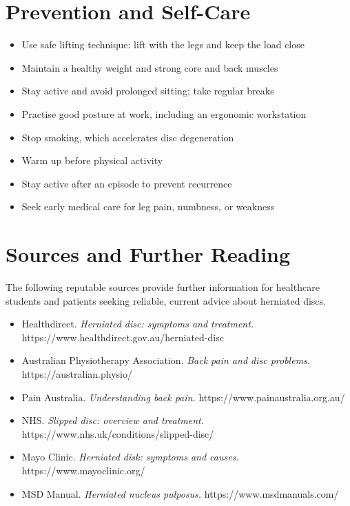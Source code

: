 \section*{Prevention and Self-Care}
\begin{itemize}
    \item Use safe lifting technique: lift with the legs and keep the load close
    \item Maintain a healthy weight and strong core and back muscles
    \item Stay active and avoid prolonged sitting; take regular breaks
    \item Practise good posture at work, including an ergonomic workstation
    \item Stop smoking, which accelerates disc degeneration
    \item Warm up before physical activity
    \item Stay active after an episode to prevent recurrence
    \item Seek early medical care for leg pain, numbness, or weakness
\end{itemize}

\section*{Sources and Further Reading}
The following reputable sources provide further information for healthcare students and patients seeking reliable, current advice about herniated discs.

\begin{itemize}
    \item Healthdirect. \textit{Herniated disc: symptoms and treatment.} https://www.healthdirect.gov.au/herniated-disc
    \item Australian Physiotherapy Association. \textit{Back pain and disc problems.} https://australian.physio/
    \item Pain Australia. \textit{Understanding back pain.} https://www.painaustralia.org.au/
    \item NHS. \textit{Slipped disc: overview and treatment.} https://www.nhs.uk/conditions/slipped-disc/
    \item Mayo Clinic. \textit{Herniated disk: symptoms and causes.} https://www.mayoclinic.org/
    \item MSD Manual. \textit{Herniated nucleus pulposus.} https://www.msdmanuals.com/
\end{itemize}
